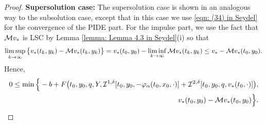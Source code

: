 \begin{proof}
    \textbf{Supersolution case:} The supersolution case is shown in an analogous way to the subsolution case, except that in this case we use \eqref{eqn: (34) in Seydel} for the convergence of the PIDE part. For the impulse part, we use the fact that $\mathcal{M} v_*$ is LSC by Lemma \ref{lemma: Lemma 4.3 in Seydel}(i) so that
    \begin{equation*}
        \limsup_{k \rightarrow \infty} \big\{ v_*(t_k,y_k) - \mathcal{M} v_*(t_k,y_k)\big\} = v_*(t_0,y_0) - \liminf_{k \rightarrow \infty} \mathcal{M} v_*(t_k,y_k) \leq v_* - \mathcal{M} v_*(t_0,y_0).
    \end{equation*}
    Hence,
    \begin{equation*}
        \begin{aligned}
            0 \leq \min \Big\{ -b + F\big(t_0, y_0, q, Y, \mathcal{I}^{1, \delta} [t_0,y_0,-\varphi_\alpha (t_0, x_0, \cdot)] + \mathcal{I}^{2, \delta} [t_0,y_0,q,v_*(t_0,\cdot)] \big), \\
            v_*(t_0,y_0) - \mathcal{M} v_* (t_0,y_0) \Big\}. 
            \qedhere
        \end{aligned}
    \end{equation*}
\end{proof}


